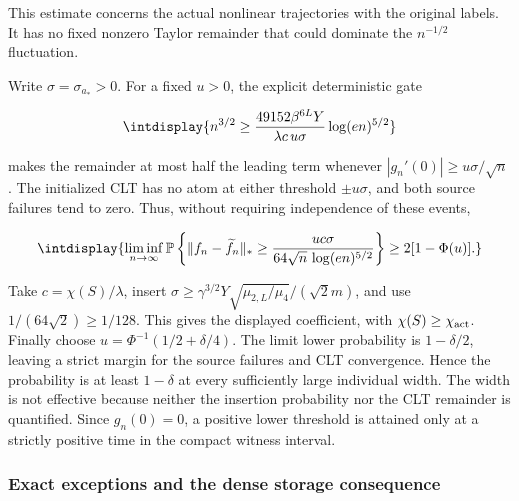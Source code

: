 
This estimate concerns the actual nonlinear trajectories with the original labels. It has no fixed nonzero Taylor remainder that could dominate the \(n^{-1/2}\) fluctuation.



Write \(\sigma=\sigma_{a_*}>0\). For a fixed \(u>0\), the explicit deterministic gate


\begingroup\renewcommand{\theHequation}{intdisplay.504}
\begin{equation*}
\intdisplay{
n^{3/2}\ge
\frac{49152\beta^{6L}Y}{\lambda c\,u\sigma}\log(en)^{5/2}
}
\end{equation*}
\endgroup


makes the remainder at most half the leading term whenever \(|g_n'(0)|\ge u\sigma/\sqrt n\). The initialized CLT has no atom at either threshold \(\pm u\sigma\), and both source failures tend to zero. Thus, without requiring independence of these events,


\begingroup\renewcommand{\theHequation}{intdisplay.505}
\begin{equation*}
\intdisplay{
\liminf_{n\to\infty}
\mathbb P\left\{\|f_n-\widetilde f_n\|_*
\ge\frac{uc\sigma}{64\sqrt n\,\log(en)^{5/2}}\right\}
\ge2[1-\Phi(u)].
}
\end{equation*}
\endgroup


Take \(c=\chi(S)/\lambda\), insert \(\sigma\ge\gamma^{3/2}Y\sqrt{\mu_{2,\allowbreak L}/\mu_4}/(\sqrt2m)\), and use \(1/(64\sqrt2)\ge1/128\). This gives the displayed coefficient, with \(\chi(S)\ge\chi_{\rm act}\). Finally choose \(u=\Phi^{-1}(1/2+\delta/4)\). The limit lower probability is \(1-\delta/2\), leaving a strict margin for the source failures and CLT convergence. Hence the probability is at least \(1-\delta\) at every sufficiently large individual width. The width is not effective because neither the insertion probability nor the CLT remainder is quantified. Since \(g_n(0)=0\), a positive lower threshold is attained only at a strictly positive time in the compact witness interval.


\subsubsection{Exact exceptions and the dense storage consequence}


